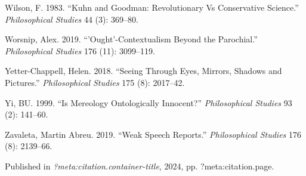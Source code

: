 \documentclass[
  10pt,
  letterpaper,
  DIV=11,
  numbers=noendperiod,
  twoside]{scrartcl}
\newlength{\cslhangindent}
\newenvironment{CSLReferences}[2] %
 {\begin{list}{}{%
  \setlength{\itemindent}{0pt}
  \setlength{\leftmargin}{0pt}
  \setlength{\parsep}{0pt}
  \ifodd #1
   \setlength{\leftmargin}{\cslhangindent}
   \setlength{\itemindent}{-1\cslhangindent}
  \fi
  \setlength{\itemsep}{#2\baselineskip}}}
 {\end{list}}
\begin{document}
\begin{CSLReferences}{1}{0}
Wilson, F. 1983. {``Kuhn and Goodman: Revolutionary Vs Conservative
Science.''} \emph{Philosophical Studies} 44 (3): 369--80.

Worsnip, Alex. 2019. {``'Ought'-Contextualism Beyond the Parochial.''}
\emph{Philosophical Studies} 176 (11): 3099--119.

Yetter-Chappell, Helen. 2018. {``Seeing Through Eyes, Mirrors, Shadows
and Pictures.''} \emph{Philosophical Studies} 175 (8): 2017--42.

Yi, BU. 1999. {``Is Mereology Ontologically Innocent?''}
\emph{Philosophical Studies} 93 (2): 141--60.

Zavaleta, Martin Abreu. 2019. {``Weak Speech Reports.''}
\emph{Philosophical Studies} 176 (8): 2139--66.

\end{CSLReferences}



\noindent Published in\emph{
?meta:citation.container-title}, 2024, pp. ?meta:citation.page.
\end{document}
